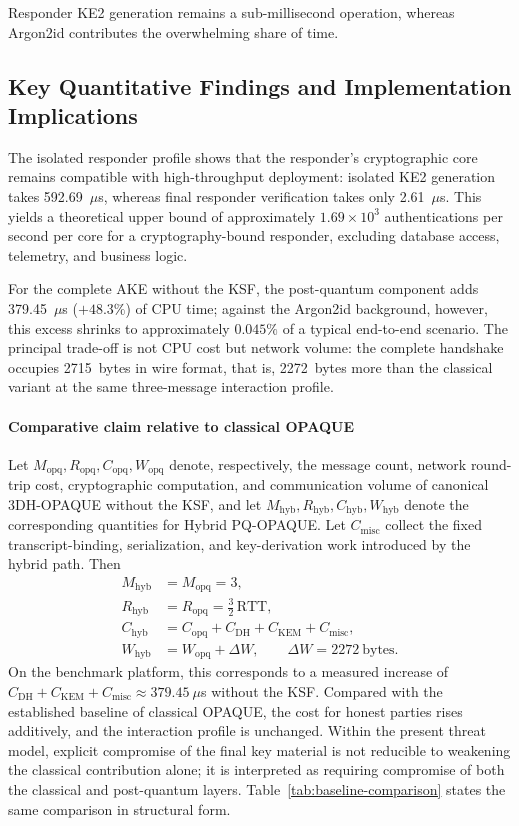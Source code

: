 \documentclass[preprint,12pt]{elsarticle}
\theoremstyle{remark}
\begin{document}
Responder KE2 generation remains a sub-millisecond operation, whereas Argon2id
contributes the overwhelming share of time.

\subsection{Key Quantitative Findings and Implementation Implications}

The isolated responder profile shows that the responder's cryptographic
core remains compatible with high-throughput deployment:
isolated KE2 generation takes 592.69~$\mu$s, whereas final responder
verification takes only 2.61~$\mu$s. This yields a theoretical upper
bound of approximately $1.69 \times 10^3$ authentications per second
per core for a cryptography-bound responder, excluding database access,
telemetry, and business logic.

For the complete AKE without the KSF, the post-quantum component adds
379.45~$\mu$s ($+48.3\%$) of CPU time; against the Argon2id background,
however, this excess shrinks to approximately $0.045\%$ of a typical
end-to-end scenario. The principal trade-off is not CPU cost but
network volume: the complete handshake occupies
2715~bytes in wire format, that is, 2272~bytes more than the classical
variant at the same three-message interaction profile.

\paragraph{Comparative claim relative to classical OPAQUE}
Let $M_{\mathrm{opq}}, R_{\mathrm{opq}}, C_{\mathrm{opq}}, W_{\mathrm{opq}}$
denote, respectively, the message count, network round-trip cost,
cryptographic computation, and communication volume of canonical
3DH-OPAQUE without the KSF, and let
$M_{\mathrm{hyb}}, R_{\mathrm{hyb}}, C_{\mathrm{hyb}}, W_{\mathrm{hyb}}$
denote the corresponding quantities for Hybrid PQ-OPAQUE. Let
$C_{\mathrm{misc}}$ collect the fixed transcript-binding, serialization,
and key-derivation work introduced by the hybrid path. Then
\[
  \begin{aligned}
    M_{\mathrm{hyb}} &= M_{\mathrm{opq}} = 3,\\
    R_{\mathrm{hyb}} &= R_{\mathrm{opq}} = \tfrac{3}{2}\,\mathrm{RTT},\\
    C_{\mathrm{hyb}} &= C_{\mathrm{opq}} + C_{\mathrm{DH}} +
      C_{\mathrm{KEM}} + C_{\mathrm{misc}},\\
    W_{\mathrm{hyb}} &= W_{\mathrm{opq}} + \Delta W,\qquad
      \Delta W = 2272~\text{bytes}.
  \end{aligned}
\]
On the benchmark platform, this corresponds to a measured increase of
$C_{\mathrm{DH}} + C_{\mathrm{KEM}} + C_{\mathrm{misc}}
\approx 379.45~\mu$s without the
KSF. Compared with the established baseline of classical OPAQUE, the
cost for honest parties rises additively, and the interaction profile is
unchanged. Within the present threat model, explicit compromise of the
final key material is not reducible to weakening the classical
contribution alone; it is interpreted as requiring compromise of both the
classical and post-quantum layers.
Table~\ref{tab:baseline-comparison} states the same comparison in
structural form.
\end{document}
